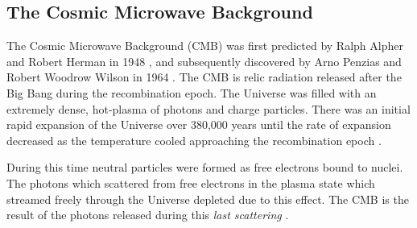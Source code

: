 \subsection{The Cosmic Microwave Background}\label{sec:DMOverview/CMB}
The Cosmic Microwave Background (CMB) was first predicted by Ralph Alpher and Robert Herman in 1948 \cite{CMBprediction}, and subsequently discovered by Arno Penzias and Robert Woodrow Wilson in 1964 \cite{CMBDisco}. The CMB is relic radiation released after the Big Bang during the recombination epoch. The Universe was filled with an extremely dense, hot-plasma of photons and charge particles. There was an initial rapid expansion of the Universe over 380,000 years until the rate of expansion decreased as the temperature cooled approaching the recombination epoch \cite{DMPrimer}. 

During this time neutral particles were formed as free electrons bound to nuclei. The photons which scattered from free electrons in the plasma state which streamed freely through the Universe depleted due to this effect. The CMB is the result of the photons released during this \textit{last scattering} \cite{Cirelli:2024ssz}.

